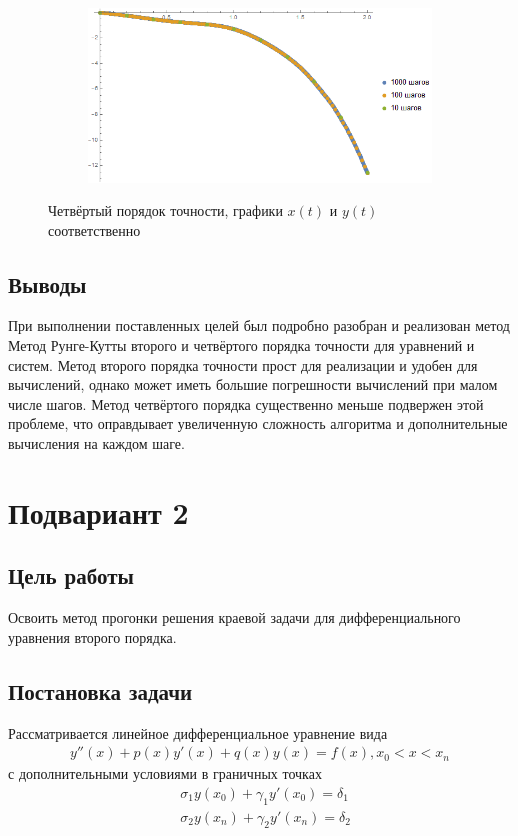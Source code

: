 \documentclass[a4paper,12pt,titlepage,finall]{article}
\begin{document}
\begin{enumerate}
\begin{figure}[h]
\begin{subfigure}{.5\textwidth}
\end{subfigure}%
\begin{subfigure}{.5\textwidth}
  \centering
  \includegraphics[width=\textwidth]{test_1_7_4_y.png}
\end{subfigure}
\caption{Четвёртый порядок точности, графики $x(t)$ и $y(t)$ соответственно}
\end{figure}
\end{enumerate}

\subsection{Выводы}
При выполнении поставленных целей был подробно разобран и реализован метод Метод Рунге-Кутты второго и четвёртого порядка точности для уравнений и систем. Метод второго порядка точности прост для реализации и удобен для вычислений, однако может иметь большие погрешности вычислений при малом числе шагов. Метод четвёртого порядка существенно меньше подвержен этой проблеме, что оправдывает увеличенную сложность алгоритма и дополнительные вычисления на каждом шаге.

\newpage
\section{Подвариант 2}
\subsection{Цель работы}
Освоить метод прогонки решения краевой задачи для дифференциального
уравнения второго порядка.

\subsection{Постановка задачи}
Рассматривается линейное дифференциальное уравнение вида
\begin{align*}
y''(x) + p(x) y'(x) + q(x) y(x) = f(x), x_0 < x < x_n  
\end{align*}
с дополнительными условиями в граничных точках
\begin{align*}
&\sigma_1 y(x_0) + \gamma_1 y'(x_0) = \delta_1\\
&\sigma_2 y(x_n) + \gamma_2 y'(x_n) = \delta_2
\end{align*}
\end{document}

